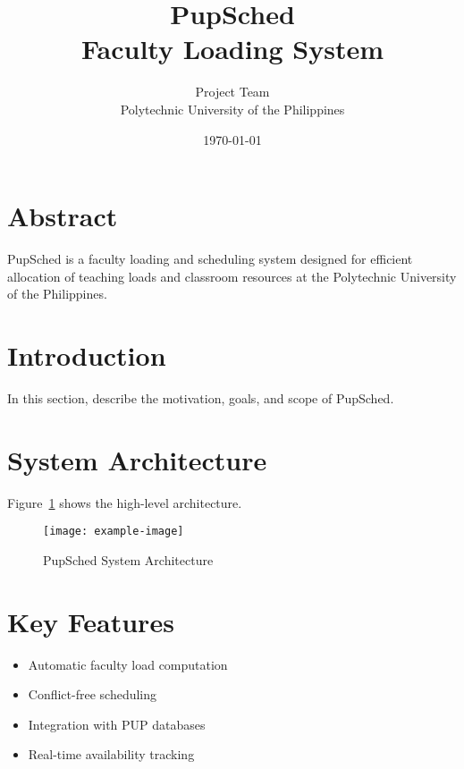 \documentclass[12pt,a4paper]{article}
\title{\textbf{\textcolor{pupred}{PupSched}} \\ Faculty Loading System}
\author{Project Team \\ Polytechnic University of the Philippines}
\date{\today}
\begin{document}
\maketitle
\thispagestyle{empty}
\newpage

\tableofcontents
\newpage

\section{Abstract}
PupSched is a faculty loading and scheduling system designed for efficient allocation of teaching loads and classroom resources at the Polytechnic University of the Philippines.

\section{Introduction}
In this section, describe the motivation, goals, and scope of PupSched.

\section{System Architecture}
Figure~\ref{fig:arch} shows the high-level architecture.

\begin{figure}[h]
    \centering
    \texttt{[image: example-image]} %
    \caption{PupSched System Architecture}
    \label{fig:arch}
\end{figure}

\section{Key Features}
\begin{itemize}
    \item Automatic faculty load computation
    \item Conflict-free scheduling
    \item Integration with PUP databases
    \item Real-time availability tracking
\end{itemize}
\end{document}
